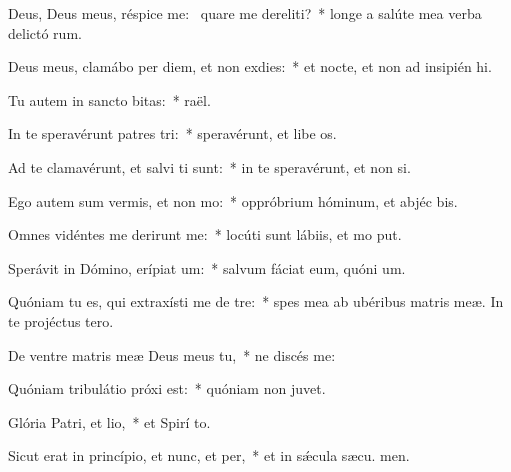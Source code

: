 \item Deus, Deus meus, réspice  me:~\pscross{} quare me dereliti?~* longe a salúte mea verba delictó rum.
\item Deus meus, clamábo per diem, et non exdies:~* et nocte, et non ad insipién hi.
\item Tu autem in sancto bitas:~*  raël.
\item In te speravérunt patres tri:~* speravérunt, et libe os.
\item Ad te clamavérunt, et salvi ti sunt:~* in te speravérunt, et non  si.
\item Ego autem sum vermis, et non mo:~* oppróbrium hóminum, et abjéc bis.
\item Omnes vidéntes me derirunt me:~* locúti sunt lábiis, et mo put.
\item Sperávit in Dómino, erípiat um:~* salvum fáciat eum, quóni  um.
\item Quóniam tu es, qui extraxísti me de tre:~* spes mea ab ubéribus matris meæ. In te projéctus   tero.
\item De ventre matris meæ Deus meus  tu,~* ne discés  me:
\item Quóniam tribulátio próxi est:~* quóniam non   juvet.
\item Glória Patri, et lio,~* et Spirí to.
\item Sicut erat in princípio, et nunc, et per,~* et in sǽcula sæcu. men.

